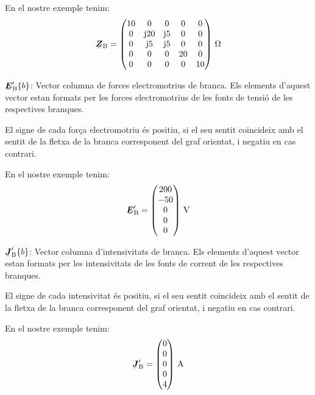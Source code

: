 \begin{list}{}
   En el nostre exemple tenim:
   \[
      \mcmplx{Z}\ped{B} = \begin{pmatrix}
            10 & 0 & 0 & 0 & 0 \\
            0 & \ju 20 & \ju 5 & 0 & 0 \\
            0 & \ju 5 & \ju 5 & 0 & 0 \\
            0 & 0 & 0 & 20 & 0 \\
            0 & 0 & 0 & 0 & 10
      \end{pmatrix}\unit{\ohm}
   \]

   \item[$\mcmplx{E}'\ped{B}\{b\}$:] Vector columna de forces electromotrius de branca. Els elements d'aquest vector estan formats per les forces electromotrius de les fonts de tensi\'{o} de les respectives branques.

El signe de cada for\c{c}a electromotriu \'{e}s positiu, si el seu sentit coincideix amb el sentit de la fletxa de la branca corresponent del graf orientat, i negatiu en cas contrari.

   En el nostre exemple tenim:
   \[
      \mcmplx{E}'\ped{B} = \begin{pmatrix} 200 \\ -50 \\ 0 \\ 0 \\ 0 \end{pmatrix}\unit{V}
   \]

   \item[$\mcmplx{J}'\ped{B}\{b\}$:] Vector columna d'intensivitats de branca. Els elements d'aquest vector estan formats per les intensivitats de les fonts de corrent de les respectives branques.

El signe de cada intensivitat \'{e}s positiu, si el seu sentit coincideix amb el sentit de la fletxa de la branca corresponent del graf orientat, i negatiu en cas contrari.

   En el nostre exemple tenim:
   \[
      \mcmplx{J}'\ped{B} = \begin{pmatrix} 0 \\ 0 \\ 0 \\ 0 \\ 4 \end{pmatrix}\unit{A}
   \]

\end{list}

